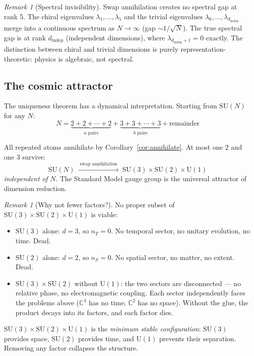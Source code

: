 \documentclass[12pt]{article}
\theoremstyle{remark}
\newtheorem{remark}[theorem]{Remark}
\theoremstyle{definition}
\begin{document}
\begin{remark}[Spectral invisibility]
Swap annihilation creates no spectral gap at rank 5. The chiral eigenvalues $\lambda_1, \ldots, \lambda_5$ and the trivial eigenvalues $\lambda_6, \ldots, \lambda_{d_\text{indep}}$ merge into a continuous spectrum as $N \to \infty$ (gap $\sim 1/\sqrt{N}$). The true spectral gap is at rank $d_\text{indep}$ (independent dimensions), where $\lambda_{d_\text{indep}+1} = 0$ exactly. The distinction between chiral and trivial dimensions is purely representation-theoretic: physics is algebraic, not spectral.
\end{remark}

\subsection{The cosmic attractor}

The uniqueness theorem has a dynamical interpretation. Starting from $\text{SU}(N)$ for any $N$:
\begin{equation}
N = \underbrace{2 + 2 + \cdots + 2}_{a\text{ pairs}} + \underbrace{3 + 3 + \cdots + 3}_{b\text{ pairs}} + \text{remainder}
\end{equation}

All repeated atoms annihilate by Corollary~\ref{cor:annihilate}. At most one 2 and one 3 survive:
\begin{equation}
\text{SU}(N) \;\xrightarrow{\;\text{swap annihilation}\;}\; \text{SU}(3) \times \text{SU}(2) \times \text{U}(1)
\end{equation}
\emph{independent of $N$}. The Standard Model gauge group is the universal attractor of dimension reduction.

\begin{remark}[Why not fewer factors?]
No proper subset of $\text{SU}(3) \times \text{SU}(2) \times \text{U}(1)$ is viable:
\begin{itemize}
\item $\text{SU}(3)$ alone: $d = 3$, so $n_T = 0$. No temporal sector, no unitary evolution, no time. Dead.
\item $\text{SU}(2)$ alone: $d = 2$, so $n_S = 0$. No spatial sector, no matter, no extent. Dead.
\item $\text{SU}(3) \times \text{SU}(2)$ without $\text{U}(1)$: the two sectors are disconnected --- no relative phase, no electromagnetic coupling. Each sector independently faces the problems above ($\mathbb{C}^3$ has no time; $\mathbb{C}^2$ has no space). Without the glue, the product decays into its factors, and each factor dies.
\end{itemize}
$\text{SU}(3) \times \text{SU}(2) \times \text{U}(1)$ is the \emph{minimum stable configuration}: $\text{SU}(3)$ provides space, $\text{SU}(2)$ provides time, and $\text{U}(1)$ prevents their separation. Removing any factor collapses the structure.
\end{remark}
\end{document}
